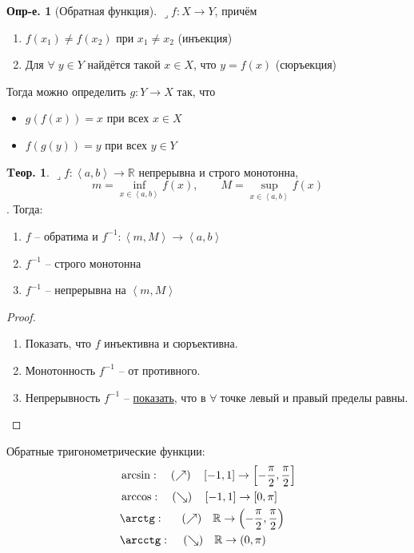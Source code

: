 \documentclass[a4paper,12pt]{article}
\numberwithin{figure}{section}
\theoremstyle{definition}
\newtheorem{definition}{Опр-е.}[section]
\newtheorem{theorem}{Tеор.}[section]
\def\DS{\displaystyle}
\def\R{\mathbb{R}}
\def\on{\!:}
\def\intab{\left<a,b\right>}
\def\lets{{\huge$\lrcorner$}\space}
\def\any{$\forall\;$}
\begin{document}
\begin{definition}[Обратная функция]
	\lets $f\on X\to Y$, причём\begin{enumerate}
		\item $f(x_1)\ne f(x_2)$ при $x_1\ne x_2$ (инъекция)
		\item Для \any $y\in Y$ найдётся такой $x\in X$, что $y=f(x)$ (сюръекция)
	\end{enumerate}
	Тогда можно определить $g\on Y\to X$ так, что\begin{itemize}
		\item $g(f(x))=x$ при всех $x\in X$
		\item $f(g(y))=y$ при всех $y\in Y$
	\end{itemize}
\end{definition}

\begin{theorem}
	\lets $f\on \intab\to\R$ непрерывна и строго монотонна,
	\[ \DS m=\inf_{x \in \intab}f(x) ,\qquad \DS M=\sup_{x \in \intab}f(x)\].
	Тогда:
	\begin{enumerate}
		\item $f$ -- обратима и $f^{-1}\on \left<m,M\right> \to \intab$
		\item $f^{-1}$ -- строго монотонна
		\item $f^{-1}$ -- непрерывна на $\left<m,M\right>$
	\end{enumerate}
\end{theorem}
\begin{proof}
  \leavevmode
  \begin{enumerate}
	\item Показать, что $f$ инъективна и сюръективна.
	\item Монотонность $f^{-1}$ -- от противного.
	\item Непрерывность $f^{-1}$ -- \href{https://stepik.org/lesson/9530/step/6}{показать},
		  что в \any точке левый и правый пределы равны.
  \end{enumerate}
\end{proof}


Обратные тригонометрические функции:
\begin{align*}
	  & \arcsin:     \quad (\nearrow) \quad \left[ -1, 1 \right] \to \left[ -\frac\pi2, \frac\pi2 \right]
	\\& \arccos:     \quad (\searrow) \quad \left[ -1, 1 \right] \to \left[ 0, \pi \right]
	\\& \arctg: \;\; \quad (\nearrow) \quad \R \to \left( -\frac\pi2, \frac\pi2 \right)
	\\& \arcctg:  \, \quad (\searrow) \quad \R \to \left( 0, \pi \right)
\end{align*}
\end{document}
